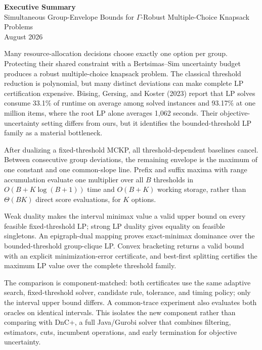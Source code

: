 \documentclass[11pt]{article}
\begin{document}
\begin{center}
{\large\bfseries Executive Summary}\\[0.35em]
{\normalsize Simultaneous Group-Envelope Bounds for $\Gamma$-Robust Multiple-Choice Knapsack Problems}\\[0.35em]
{\small August 2026}
\end{center}

Many resource-allocation decisions choose exactly one option per group.  Protecting their shared constraint with a Bertsimas--Sim uncertainty budget produces a robust multiple-choice knapsack problem.  The classical threshold reduction is polynomial, but many distinct deviations can make complete LP certification expensive.  B\"using, Gersing, and Koster (2023) report that LP solves consume 33.1\% of runtime on average among solved instances and 93.17\% at one million items, where the root LP alone averages 1,062 seconds.  Their objective-uncertainty setting differs from ours, but it identifies the bounded-threshold LP family as a material bottleneck.

After dualizing a fixed-threshold MCKP, all threshold-dependent baselines cancel.  Between consecutive group deviations, the remaining envelope is the maximum of one constant and one common-slope line.  Prefix and suffix maxima with range accumulation evaluate one multiplier over all $B$ thresholds in $O(B+K\log(B+1))$ time and $O(B+K)$ working storage, rather than $\Theta(BK)$ direct score evaluations, for $K$ options.

Weak duality makes the interval minimax value a valid upper bound on every feasible fixed-threshold LP; strong LP duality gives equality on feasible singletons.  An epigraph-dual mapping proves exact-minimax dominance over the bounded-threshold group-clique LP.  Convex bracketing returns a valid bound with an explicit minimization-error certificate, and best-first splitting certifies the maximum LP value over the complete threshold family.

The comparison is component-matched: both certificates use the same adaptive search, fixed-threshold solver, candidate rule, tolerance, and timing policy; only the interval upper bound differs.  A common-trace experiment also evaluates both oracles on identical intervals.  This isolates the new component rather than comparing with DnC+, a full Java/Gurobi solver that combines filtering, estimators, cuts, incumbent operations, and early termination for objective uncertainty.
\end{document}

